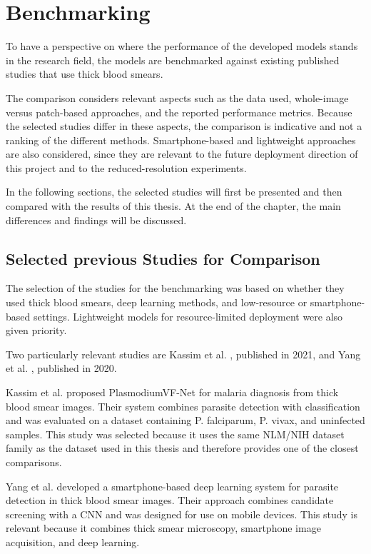 \chapter{Benchmarking}
\label{chap:benchmarking}

To have a perspective on where the performance of the developed models stands in the research field, the models are benchmarked against existing published studies that use thick blood smears.

The comparison considers relevant aspects such as the data used, whole-image versus patch-based approaches, and the reported performance metrics. Because the selected studies differ in these aspects, the comparison is indicative and not a ranking of the different methods. Smartphone-based and lightweight approaches are also considered, since they are relevant to the future deployment direction of this project and to the reduced-resolution experiments.

In the following sections, the selected studies will first be presented and then compared with the results of this thesis. At the end of the chapter, the main differences and findings will be discussed.

\section{Selected previous Studies for Comparison}

The selection of the studies for the benchmarking was based on whether they used thick blood smears, deep learning methods, and low-resource or smartphone-based settings. Lightweight models for resource-limited deployment were also given priority. 

Two particularly relevant studies are Kassim et al. \cite{Kassim2021}, published in 2021, and Yang et al. \cite{Yang2020}, published in 2020.

Kassim et al. \cite{Kassim2021} proposed PlasmodiumVF-Net for malaria diagnosis from thick blood smear images. Their system combines parasite detection with classification and was evaluated on a dataset containing P. falciparum, P. vivax, and uninfected samples. This study was selected because it uses the same NLM/NIH dataset family as the dataset used in this thesis and therefore provides one of the closest comparisons.

Yang et al. \cite{Yang2020} developed a smartphone-based deep learning system for parasite detection in thick blood smear images. Their approach combines candidate screening with a CNN and was designed for use on mobile devices. This study is relevant because it combines thick smear microscopy, smartphone image acquisition, and deep learning.

